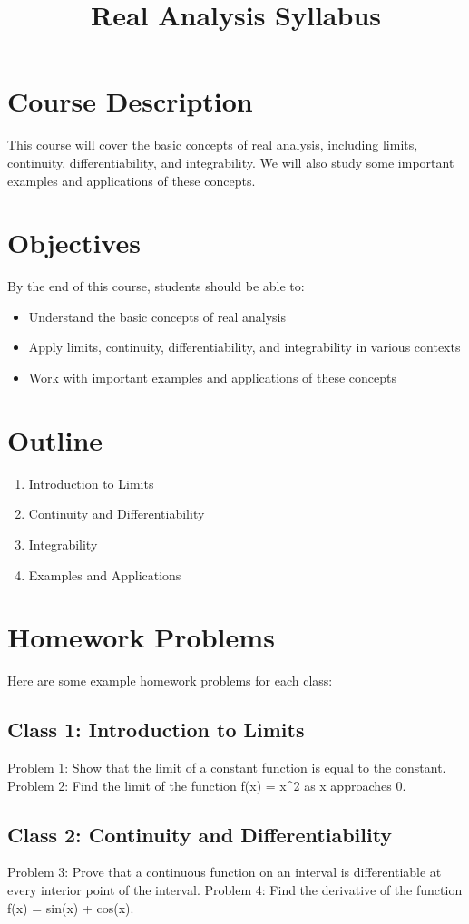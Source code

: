 \documentclass{article}
\title{Real Analysis Syllabus}
\author{}
\date{}
\begin{document}
\maketitle
\section*{Course Description}
This course will cover the basic concepts of real analysis, including limits, 
continuity, differentiability, and integrability. We will also study some important 
examples and applications of these concepts.
\section*{Objectives}
By the end of this course, students should be able to:
\begin{itemize}
\item Understand the basic concepts of real analysis
\item Apply limits, continuity, differentiability, and integrability in various contexts
\item Work with important examples and applications of these concepts
\end{itemize}
\section*{Outline}
\begin{enumerate}
\item Introduction to Limits
\item Continuity and Differentiability
\item Integrability
\item Examples and Applications
\end{enumerate}
\section*{Homework Problems}
Here are some example homework problems for each class:
\subsection*{Class 1: Introduction to Limits}
Problem 1: Show that the limit of a constant function is equal to the constant.
Problem 2: Find the limit of the function f(x) = x^2 as x approaches 0.
\subsection*{Class 2: Continuity and Differentiability}
Problem 3: Prove that a continuous function on an interval is differentiable at every 
interior point of the interval.
Problem 4: Find the derivative of the function f(x) = sin(x) + cos(x).
\end{document}
